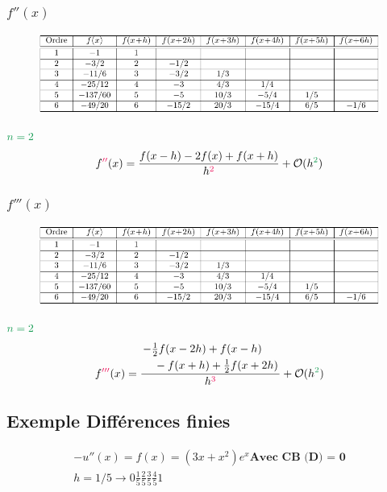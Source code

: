 \documentclass[resume]{subfiles}
\begin{document}
\subsubsection{$f''(x)$}
\begin{figure}[H]
\centering
\includegraphics[width=\columnwidth,page=6]{diff_finies_tableaux.pdf}
\end{figure}
$\textcolor{ForestGreen}{n=2}$
$$f\textcolor{OrangeRed}{''}(x)=\frac{f(x-h)-2f(x)+f(x+h)}{h^{\textcolor{OrangeRed}{2}}}+\mathcal{O}(h^{\textcolor{ForestGreen}{2}})$$
\subsubsection{$f'''(x)$}
\begin{figure}[H]
\centering
\includegraphics[width=\columnwidth,page=7]{diff_finies_tableaux.pdf}
\end{figure}
$\textcolor{ForestGreen}{n=2}$
$$f\textcolor{OrangeRed}{'''}(x)=\frac{\splitdfrac{-\frac{1}{2}f(x-2h)+f(x-h)}{-f(x+h)+\frac{1}{2}f(x+2h)}}{h^{\textcolor{OrangeRed}{3}}}+\mathcal{O}(h^{\textcolor{ForestGreen}{2}})$$

\subsection{Exemple Différences finies}
\begin{align*} %
-u''(x) = f(x) = (3x+x^2)e^x \textbf{Avec CB (D) = 0}\\
h=1/5 \rightarrow 0 \frac{1}{5} \frac{2}{5} \frac{3}{5} \frac{4}{5} 1

\end{align*}
\end{document}

